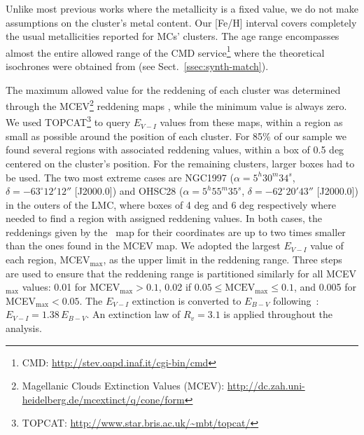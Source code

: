 \documentclass[referee]{aa}
\begin{document}
Unlike most previous works where the metallicity is a fixed value, we do not
make assumptions on the cluster's metal content. Our [Fe/H] interval covers
completely the usual metallicities reported for MCs' clusters.
The age range encompasses almost the entire allowed range of the CMD
service\footnote{CMD\@: \url{http://stev.oapd.inaf.it/cgi-bin/cmd}}
where the theoretical isochrones were obtained from (see
Sect.~\ref{ssec:synth-match}).

The maximum allowed value for the reddening of each cluster was determined
through the MCEV\footnote{Magellanic Clouds Extinction Values (MCEV):
\url{http://dc.zah.uni-heidelberg.de/mcextinct/q/cone/form}} reddening maps
\citep{Haschke_2011}, while the minimum value is always zero.
%
We used TOPCAT\footnote{TOPCAT\@: \url{http://www.star.bris.ac.uk/~mbt/topcat/}}
to query $E_{V-I}$ values from these maps, within a region as small as possible
around the position of each cluster.
For 85\% of our sample we found several regions with associated reddening
values, within a box of 0.5 deg centered on the cluster's position.
For the remaining clusters, larger boxes had to be used. The two most extreme
cases are NGC1997
($\alpha{=}5^h30^m34^s$, $\delta{=}-63^\circ12'12''$ [J2000.0]) and OHSC28
($\alpha{=}5^h55^m35^s$, $\delta{=}-62^\circ20'43''$ [J2000.0]) in the outers
of the LMC, where boxes of 4 deg and 6 deg respectively where needed to find a
region with assigned reddening values. In both cases, the reddenings given by
the~\cite{Schlafly_2011} map for their coordinates are up to two times smaller
than the ones found in the MCEV map.
%
We adopted the largest $E_{V-I}$ value of each region, MCEV$_{\max}$, as the
upper limit in the reddening range. Three steps are used to ensure that the
reddening range is partitioned similarly for all MCEV$_{\max}$ values: 0.01 for
MCEV$_{\max} {>}0.1$, 0.02 if $0.05{\leq}\mathrm{MCEV}_{\max}{\leq}0.1$, and
0.005 for MCEV$_{\max}{<}0.05$.
%
The $E_{V-I}$ extinction is converted to $E_{B-V}$
following~\cite{Tammann_2003}: $E_{V-I}{=}1.38\,E_{B-V}$. An extinction
law of $R_v{=}3.1$ is applied throughout the analysis.
\end{document}
